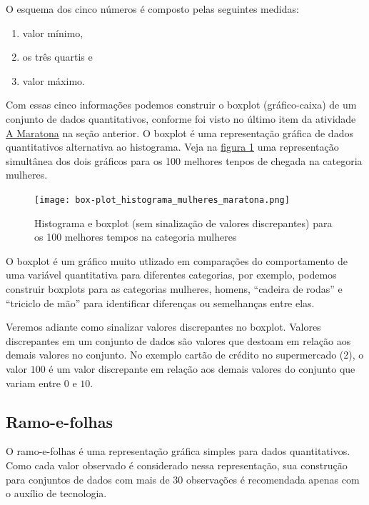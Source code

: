 O esquema dos cinco números é composto pelas seguintes medidas:

\begin{enumerate}
\item valor mínimo,
\item os três quartis e
\item valor máximo.
\end{enumerate}

Com essas cinco informações podemos construir o boxplot (gráfico-caixa) de um conjunto de dados quantitativos, conforme foi visto no último item da atividade \hyperref[\detokenize{PE104-0:ativ-maratona-de-ny}]{A Maratona} na seção anterior. O boxplot é uma representação gráfica de dados quantitativos alternativa ao histograma. Veja na \hyperref[boxplot-maratona]{figura \ref{boxplot-maratona}} uma representação simultânea dos dois gráficos para os 100 melhores tenpos de chegada na categoria mulheres.

\begin{figure}[H]
\centering

\texttt{[image: box-plot\_histograma\_mulheres\_maratona.png]}
\caption{Histograma e boxplot (sem sinalização de valores discrepantes) para os 100 melhores tempos na categoria mulheres}
\label{boxplot-maratona}
\end{figure}

O boxplot é um gráfico muito utlizado em comparações do comportamento de uma variável quantitativa para diferentes categorias, por exemplo, podemos construir boxplots para as categorias mulheres, homens, “cadeira de rodas”{} e “triciclo de mão”{} para identificar diferenças ou semelhanças entre elas.

Veremos adiante como sinalizar valores discrepantes no boxplot. Valores discrepantes em um conjunto de dados são valores que destoam em relação aos demais valores no conjunto. No exemplo cartão de crédito no supermercado (2), o valor $100$ é um valor discrepante em relação aos demais valores do conjunto que variam entre $0$ e $10$.

\subsection{Ramo-e-folhas}

O ramo-e-folhas é uma representação gráfica simples para dados quantitativos. Como cada valor observado é considerado nessa representação, sua construção para conjuntos de dados com mais de $30$ observações é recomendada apenas com o auxílio de tecnologia.

